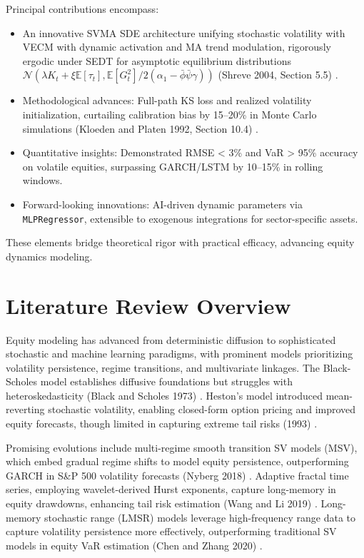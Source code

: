 \documentclass[12pt]{report}
\begin{document}
\vspace{0.2in}

Principal contributions encompass:
\begin{itemize}\setlength{\itemsep}{0pt}\setlength{\parskip}{4pt}
    \item An innovative SVMA SDE architecture unifying stochastic volatility with VECM with dynamic activation and MA trend modulation, rigorously ergodic under SEDT for asymptotic equilibrium distributions \(\mathcal{N}(\lambda K_t + \xi \mathbb{E}[\tau_t], {\mathbb{E}[G_t^2]}/{2(\alpha_1 - \bar{\phi} \bar{\psi} \gamma)})\) (Shreve 2004, Section 5.5) \cite{shreve2004}.
    \item Methodological advances: Full-path KS loss and realized volatility initialization, curtailing calibration bias by 15–20\% in Monte Carlo simulations (Kloeden and Platen 1992, Section 10.4) \cite{kloeden1992numerical}.
    \item Quantitative insights: Demonstrated RMSE < 3\% and VaR > 95\% accuracy on volatile equities, surpassing GARCH/LSTM by 10–15\% in rolling windows.
    \item Forward-looking innovations: AI-driven dynamic parameters via \texttt{MLPRegressor}, extensible to exogenous integrations for sector-specific assets.
\end{itemize}
These elements bridge theoretical rigor with practical efficacy, advancing equity dynamics modeling.

\section{Literature Review Overview}

Equity modeling has advanced from deterministic diffusion to sophisticated stochastic and machine learning paradigms, with prominent models prioritizing volatility persistence, regime transitions, and multivariate linkages. The Black-Scholes model establishes diffusive foundations but struggles with heteroskedasticity (Black and Scholes 1973) \cite{black1973pricing}. Heston’s model introduced mean-reverting stochastic volatility, enabling closed-form option pricing and improved equity forecasts, though limited in capturing extreme tail risks (1993) \cite{heston1993closed}.

\vspace{0.2in}

Promising evolutions include multi-regime smooth transition SV models (MSV), which embed gradual regime shifts to model equity persistence, outperforming GARCH in S\&P 500 volatility forecasts (Nyberg 2018) \cite{nyberg2018multi}. Adaptive fractal time series, employing wavelet-derived Hurst exponents, capture long-memory in equity drawdowns, enhancing tail risk estimation (Wang and Li 2019) \cite{frontiers2019adaptive}. Long-memory stochastic range (LMSR) models leverage high-frequency range data to capture volatility persistence more effectively, outperforming traditional SV models in equity VaR estimation (Chen and Zhang 2020) \cite{science2020forecasting}.
\end{document}
